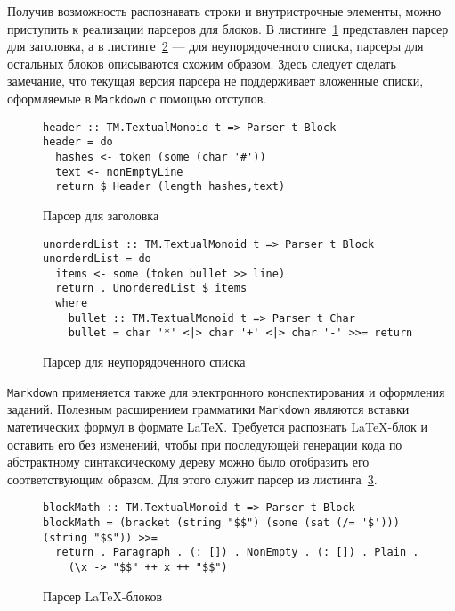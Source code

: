 Получив возможность распознавать строки и внутристрочные элементы, можно приступить к реализации парсеров для блоков. В листинге~\ref{listing:MarkdownHeader} представлен парсер для заголовка, а в листинге~\ref{listing:markdownUlist} --- для неупорядоченного списка, парсеры для остальных блоков описываются схожим образом. Здесь следует сделать замечание, что текущая версия парсера не поддерживает вложенные списки, оформляемые в \lstinline{Markdown} с помощью отступов. 

\begin{figure}[t]
\begin{lstlisting}
header :: TM.TextualMonoid t => Parser t Block 
header = do
  hashes <- token (some (char '#')) 
  text <- nonEmptyLine
  return $ Header (length hashes,text)
\end{lstlisting}
\caption{Парсер для заголовка}
\label{listing:MarkdownHeader}
\end{figure} 

\begin{figure}[t]
\begin{lstlisting}
unorderdList :: TM.TextualMonoid t => Parser t Block
unorderdList = do
  items <- some (token bullet >> line)
  return . UnorderedList $ items 
  where
    bullet :: TM.TextualMonoid t => Parser t Char
    bullet = char '*' <|> char '+' <|> char '-' >>= return
\end{lstlisting}
\caption{Парсер для неупорядоченного списка}
\label{listing:markdownUlist}
\end{figure} 

\lstinline{Markdown} применяется также для электронного конспектирования и оформления заданий. Полезным расширением грамматики \lstinline{Markdown} являются вставки матетических формул в формате \LaTeX. Требуется распознать \LaTeX-блок и оставить его без изменений, чтобы при последующей генерации кода по абстрактному синтаксическому дереву можно было отобразить его соответствующим образом. Для этого служит парсер из листинга~\ref{listing:MarkdownLaTeX}.

\begin{figure}[h]
\begin{lstlisting}
blockMath :: TM.TextualMonoid t => Parser t Block
blockMath = (bracket (string "$$") (some (sat (/= '$'))) (string "$$")) >>= 
  return . Paragraph . (: []) . NonEmpty . (: []) . Plain . 
    (\x -> "$$" ++ x ++ "$$") 
\end{lstlisting}
\caption{Парсер \LaTeX-блоков}
\label{listing:MarkdownLaTeX}
\end{figure} 

